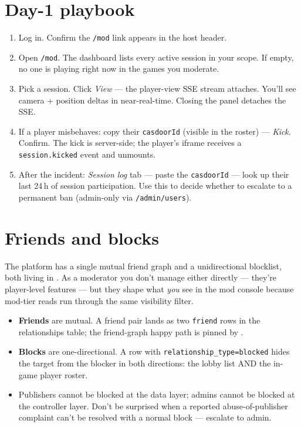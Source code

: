 \documentclass[11pt,a4paper,openany]{book}
\begin{document}
\chapter{Day-1 playbook}
\begin{enumerate}
  \item Log in. Confirm the \texttt{/mod} link appears in the host
        header.
  \item Open \texttt{/mod}. The dashboard lists every active session
        in your scope. If empty, no one is playing right now in the
        games you moderate.
  \item Pick a session. Click \emph{View} --- the player-view SSE
        stream attaches. You'll see camera + position deltas in
        near-real-time. Closing the panel detaches the SSE.
  \item If a player misbehaves: copy their \texttt{casdoorId} (visible
        in the roster) --- \emph{Kick}. Confirm. The kick is
        server-side; the player's iframe receives a
        \texttt{session.kicked} event and unmounts.
  \item After the incident: \emph{Session log} tab --- paste the
        \texttt{casdoorId} --- look up their last 24\,h of session
        participation. Use this to decide whether to escalate to a
        permanent ban (admin-only via \texttt{/admin/users}).
\end{enumerate}

\chapter{Friends and blocks}
The platform has a single mutual friend graph and a unidirectional
blocklist, both living in . As a
moderator you don't manage either directly --- they're player-level
features --- but they shape what \emph{you} see in the mod console
because mod-tier reads run through the same visibility filter.

\begin{itemize}
  \item \textbf{Friends} are mutual. A friend pair lands as two
        \texttt{friend} rows in the relationships table; the
        friend-graph happy path is pinned by
        .
  \item \textbf{Blocks} are one-directional. A row with
        \texttt{relationship\_type=blocked} hides the target from the
        blocker in both directions: the lobby list AND the in-game
        player roster.
  \item Publishers cannot be blocked at the data layer; admins cannot
        be blocked at the controller layer. Don't be surprised when a
        reported abuse-of-publisher complaint can't be resolved with
        a normal block --- escalate to admin.
\end{itemize}
\end{document}
